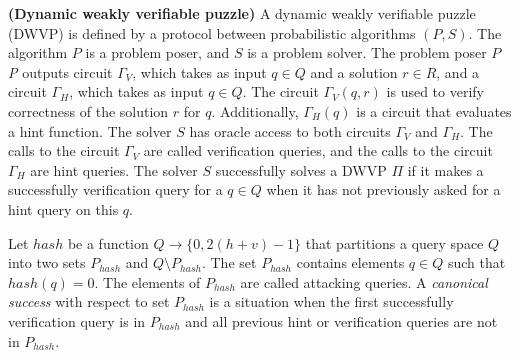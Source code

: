 \documentclass[11pt,a4paper,article,oneside]{memoir}
\begin{document}
\begin{definition} {\textbf{(Dynamic weakly verifiable puzzle)}}
  A dynamic weakly verifiable puzzle (DWVP) is defined by a protocol between probabilistic algorithms $(P,S)$.
  The algorithm $P$ is a problem poser, and $S$ is a problem solver.
  The problem poser $P$
  \textit{P} outputs circuit $\Gamma_{V}$, which takes as input $q \in Q$ and a solution $r \in R$,
  and a circuit $\Gamma_{H}$, which takes as input $q \in Q$.
  The circuit $\Gamma_{V}(q,r)$ is used to verify correctness of the solution $r$ for $q$.
  Additionally, $\Gamma_{H}(q)$ is a circuit that evaluates a hint function.
  The solver $S$ has oracle access to both circuits $\Gamma_V$ and $\Gamma_H$.
  The calls to the circuit $\Gamma_V$ are called verification queries, and the calls to the circuit $\Gamma_H$ are hint queries.
  The solver $S$ successfully solves a DWVP $\Pi$ if it makes a successfully verification query for a $q \in Q$ when
  it has not previously asked for a hint query on this $q$.
\end{definition}
%
Let $hash$ be a function $Q \rightarrow \{0, 2(h+v)-1 \}$ that partitions a query space $Q$ into two sets $P_{hash}$ and $Q \setminus P_{hash}$.
The set $P_{hash}$ contains elements $q \in Q$ such that $hash(q) = 0$.
The elements of $P_{hash}$ are called attacking queries.
A \textit{canonical success} with respect to set $P_{hash}$ is a situation when the first successfully verification query is in $P_{hash}$
and all previous hint or verification queries are not in $P_{hash}$.
%
\end{document}
